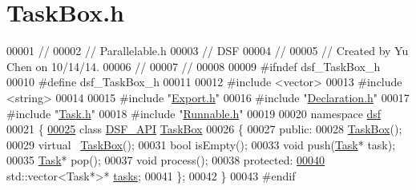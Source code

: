 \hypertarget{_task_box_8h_source}{}\section{Task\+Box.\+h}
\label{_task_box_8h_source}

\begin{DoxyCode}
00001 \textcolor{comment}{//}
00002 \textcolor{comment}{//  Parallelable.h}
00003 \textcolor{comment}{//  DSF}
00004 \textcolor{comment}{//}
00005 \textcolor{comment}{//  Created by Yu Chen on 10/14/14.}
00006 \textcolor{comment}{//}
00007 \textcolor{comment}{//}
00008 
00009 \textcolor{preprocessor}{#ifndef dsf\_TaskBox\_h}
00010 \textcolor{preprocessor}{#define dsf\_TaskBox\_h}
00011 
00012 \textcolor{preprocessor}{#include <vector>}
00013 \textcolor{preprocessor}{#include <string>}
00014 
00015 \textcolor{preprocessor}{#include "\hyperlink{dsf_2_export_8h}{Export.h}"}
00016 \textcolor{preprocessor}{#include "\hyperlink{_declaration_8h}{Declaration.h}"}
00017 \textcolor{preprocessor}{#include "\hyperlink{_task_8h}{Task.h}"}
00018 \textcolor{preprocessor}{#include "\hyperlink{_runnable_8h}{Runnable.h}"}
00019 
00020 \textcolor{keyword}{namespace }\hyperlink{namespacedsf}{dsf}
00021 \{
\hypertarget{_task_box_8h_source_l00025}{}\hyperlink{classdsf_1_1_task_box}{00025}     \textcolor{keyword}{class }\hyperlink{dsf_2_export_8h_ad7bb940831423512f29a6981786c37bd}{DSF\_API} \hyperlink{classdsf_1_1_task_box}{TaskBox}
00026     \{
00027     \textcolor{keyword}{public}:
00028         \hyperlink{namespacedsf_ac3c92e2a98380dd728b0c18d0c495966}{TaskBox}();
00029         \textcolor{keyword}{virtual} ~\hyperlink{classdsf_1_1_task_box}{TaskBox}();
00031         \textcolor{keywordtype}{bool} isEmpty();
00033         \textcolor{keywordtype}{void} push(\hyperlink{classdsf_1_1_task}{Task}* task);
00035         \hyperlink{classdsf_1_1_task}{Task}* pop();
00037         \textcolor{keywordtype}{void} process();
00038     \textcolor{keyword}{protected}:
\hypertarget{_task_box_8h_source_l00040}{}\hyperlink{classdsf_1_1_task_box_ae13d0d245cacbf7f4019f7ff5486aa79}{00040}         std::vector<Task*>* \hyperlink{classdsf_1_1_task_box_ae13d0d245cacbf7f4019f7ff5486aa79}{tasks};
00041     \};
00042 \}
00043 \textcolor{preprocessor}{#endif}
\end{DoxyCode}
